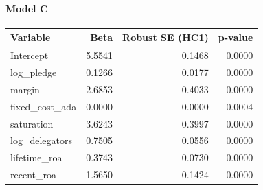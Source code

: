\paragraph{Model C}
\begin{table}[h]
\centering
\small
\begin{tabular}{lrrr}
\toprule
Variable & Beta & Robust SE (HC1) & p-value \\
\midrule
Intercept & 5.5541 & 0.1468 & 0.0000 \\
log\_pledge & 0.1266 & 0.0177 & 0.0000 \\
margin & 2.6853 & 0.4033 & 0.0000 \\
fixed\_cost\_ada & 0.0000 & 0.0000 & 0.0004 \\
saturation & 3.6243 & 0.3997 & 0.0000 \\
log\_delegators & 0.7505 & 0.0556 & 0.0000 \\
lifetime\_roa & 0.3743 & 0.0730 & 0.0000 \\
recent\_roa & 1.5650 & 0.1424 & 0.0000 \\
\bottomrule
\end{tabular}
\end{table}

